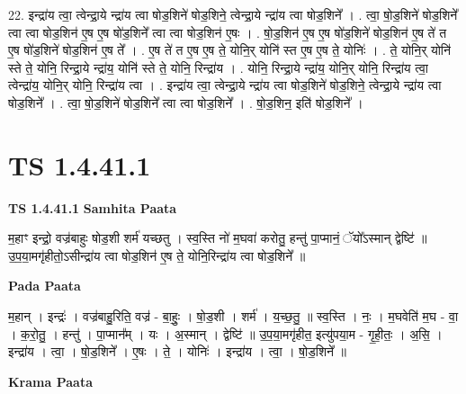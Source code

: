 \documentclass[17pt]{extarticle}
\begin{document}
22. इन्द्रा॑य त्वा॒ त्वेन्द्रा॒ये न्द्रा॑य त्वा षोड॒शिने॑ षोड॒शिने॒ त्वेन्द्रा॒ये न्द्रा॑य त्वा षोड॒शिने᳚ । . त्वा॒ षो॒ड॒शिने॑ षोड॒शिने᳚ त्वा त्वा षोड॒शिन॑ ए॒ष ए॒ष षो॑ड॒शिने᳚ त्वा त्वा षोड॒शिन॑ ए॒षः । . षो॒ड॒शिन॑ ए॒ष ए॒ष षो॑ड॒शिने॑ षोड॒शिन॑ ए॒ष ते॑ त ए॒ष षो॑ड॒शिने॑ षोड॒शिन॑ ए॒ष ते᳚ । . ए॒ष ते॑ त ए॒ष ए॒ष ते॒ योनि॒र् योनि॑ स्त ए॒ष ए॒ष ते॒ योनिः॑ । . ते॒ योनि॒र् योनि॑ स्ते ते॒ योनि॒ रिन्द्रा॒ये न्द्रा॑य॒ योनि॑ स्ते ते॒ योनि॒ रिन्द्रा॑य । . योनि॒ रिन्द्रा॒ये न्द्रा॑य॒ योनि॒र् योनि॒ रिन्द्रा॑य त्वा॒ त्वेन्द्रा॑य॒ योनि॒र् योनि॒ रिन्द्रा॑य त्वा । . इन्द्रा॑य त्वा॒ त्वेन्द्रा॒ये न्द्रा॑य त्वा षोड॒शिने॑ षोड॒शिने॒ त्वेन्द्रा॒ये न्द्रा॑य त्वा षोड॒शिने᳚ । . त्वा॒ षो॒ड॒शिने॑ षोड॒शिने᳚ त्वा त्वा षोड॒शिने᳚ । . षो॒ड॒शिन॒ इति॑ षोड॒शिने᳚ । \newline
\pagebreak
{}

\section{ TS 1.4.41.1 }

\textbf{TS 1.4.41.1 } \newline
\textbf{Samhita Paata} \newline

म॒हाꣳ इन्द्रो॒ वज्र॑बाहुः षोड॒शी शर्म॑ यच्छतु । स्व॒स्ति नो॑ म॒घवा॑ करोतु॒ हन्तु॑ पा॒प्मानं॒ ॅयो᳚ऽस्मान् द्वेष्टि॑ ॥ उ॒प॒या॒मगृ॑हीतो॒ऽसीन्द्रा॑य त्वा षोड॒शिन॑ ए॒ष ते॒ योनि॒रिन्द्रा॑य त्वा षोड॒शिने᳚ ॥ \newline

\textbf{Pada Paata} \newline

म॒हान् । इन्द्रः॑ । वज्र॑बाहु॒रिति॒ वज्र॑ - बा॒हुः॒ । षो॒ड॒शी । शर्म॑ । य॒च्छ॒तु॒ ॥ स्व॒स्ति । नः॒ । म॒घवेति॑ म॒घ - वा॒ । क॒रो॒तु॒ । हन्तु॑ । पा॒प्मान᳚म् । यः । अ॒स्मान् । द्वेष्टि॑ ॥ उ॒प॒या॒मगृ॑हीत॒ इत्यु॑पया॒म - गृ॒ही॒तः॒ । अ॒सि॒ । इन्द्रा॑य । त्वा॒ । षो॒ड॒शिने᳚ । ए॒षः । ते॒ । योनिः॑ । इन्द्रा॑य । त्वा॒ । षो॒ड॒शिने᳚ ॥  \newline


\textbf{Krama Paata} \newline
\end{document}
